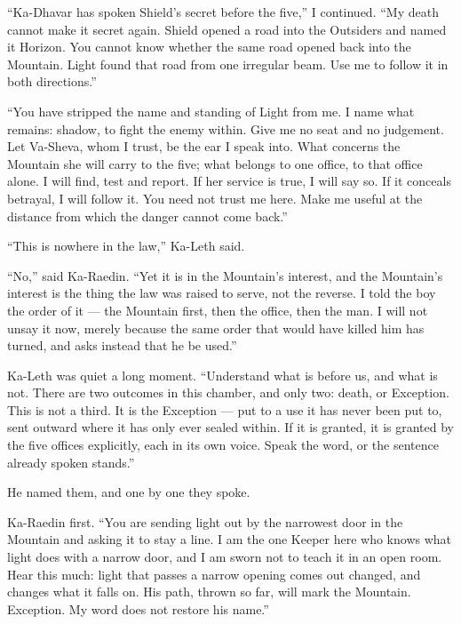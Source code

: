 ``Ka-Dhavar has spoken Shield's secret before the five,'' I continued. ``My death cannot make it secret again. Shield opened a road into the Outsiders and named it Horizon. You cannot know whether the same road opened back into the Mountain. Light found that road from one irregular beam. Use me to follow it in both directions.''\par

``You have stripped the name and standing of Light from me. I name what remains: shadow, to fight the enemy within. Give me no seat and no judgement. Let Va-Sheva, whom I trust, be the ear I speak into. What concerns the Mountain she will carry to the five; what belongs to one office, to that office alone. I will find, test and report. If her service is true, I will say so. If it conceals betrayal, I will follow it. You need not trust me here. Make me useful at the distance from which the danger cannot come back.''\par

``This is nowhere in the law,'' Ka-Leth said.\par

``No,'' said Ka-Raedin. ``Yet it is in the Mountain's interest, and the Mountain's interest is the thing the law was raised to serve, not the reverse. I told the boy the order of it --- the Mountain first, then the office, then the man. I will not unsay it now, merely because the same order that would have killed him has turned, and asks instead that he be used.''\par

Ka-Leth was quiet a long moment. ``Understand what is before us, and what is not. There are two outcomes in this chamber, and only two: death, or Exception. This is not a third. It is the Exception --- put to a use it has never been put to, sent outward where it has only ever sealed within. If it is granted, it is granted by the five offices explicitly, each in its own voice. Speak the word, or the sentence already spoken stands.''\par

He named them, and one by one they spoke.\par

Ka-Raedin first. ``You are sending light out by the narrowest door in the Mountain and asking it to stay a line. I am the one Keeper here who knows what light does with a narrow door, and I am sworn not to teach it in an open room. Hear this much: light that passes a narrow opening comes out changed, and changes what it falls on. His path, thrown so far, will mark the Mountain. Exception. My word does not restore his name.''\par

